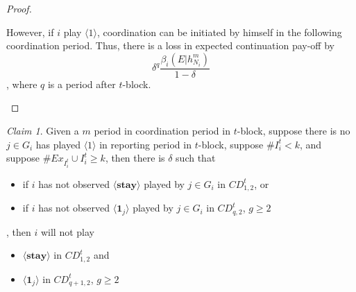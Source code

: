 \documentclass[12pt,letter]{article}
\theoremstyle{definition}
\theoremstyle{remark}
\theoremstyle{claim}
\newtheorem{claim}{Claim}
\begin{document}
\begin{proof}
\begin{itemize}
However, if $i$ play $\langle 1 \rangle$, coordination can be initiated by himself in the following coordination period. Thus, there is a loss in expected continuation pay-off by
\[\delta^{q}\frac{\beta_{i}(E|h^{m}_{N_i})}{1-\delta} \], where $q$ is a period after $t$-block.
\end{itemize}

\end{proof}




\begin{claim} 
\label{claim_report_with_no_message_coordination_period}
Given a $m$ period in coordination period in $t$-block, suppose there is no $j\in G_i$ has played $\langle 1 \rangle$ in reporting period in $t$-block, suppose $\# I^t_i<k$, and suppose $\# Ex_{I^{t}_i}\cup I^{t}_i \geq k$, then there is $\delta$ such that 
\begin{itemize}
\item if $i$ has not observed $\langle \textbf{stay} \rangle$ played by $j\in G_i$ in $CD^t_{1,2}$, or
\item if $i$ has not observed $\langle \mathbf{1}_j \rangle$ played by $j\in G_i$ in $CD^t_{q,2}$, $g\geq 2$
\end{itemize}
, then $i$ will not play
\begin{itemize}
\item $\langle \textbf{stay} \rangle$  in $CD^t_{1,2}$ and
\item $\langle \mathbf{1}_j \rangle$  in $CD^t_{q+1,2}$, $g\geq 2$
\end{itemize}
\end{claim}
\end{document}
